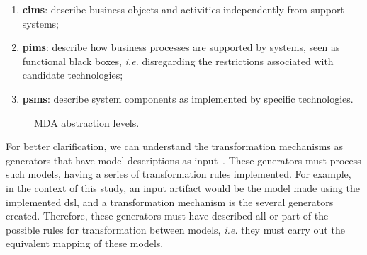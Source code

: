 \begin{enumerate}
     \item \textbf{\acp{cim}}: describe business objects and activities independently from support systems;
     \item \textbf{\acp{pim}}: describe how business processes are supported by systems, seen as functional black boxes, \textit{i.e.} disregarding the restrictions associated with candidate technologies;
     \item \textbf{\acp{psm}}: describe system components as implemented by specific technologies.
\end{enumerate}

\begin{figure}[!htb]
    \centering
    \caption{MDA abstraction levels.}
    
    \label{fig:MDA}
\end{figure}

For better clarification, we can understand the transformation mechanisms as generators that have model descriptions as input~\cite{Hutchinson:2011}.
These generators must process such models, having a series of transformation rules implemented.
For example, in the context of this study, an input artifact would be the model made using the implemented \ac{dsl}, and a transformation mechanism is the several generators created.
Therefore, these generators must have described all or part of the possible rules for transformation between models, \textit{i.e.} they must carry out the equivalent mapping of these models.

